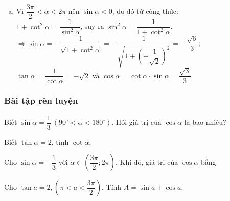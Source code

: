 \begin{vd}
{\begin{enumerate}[a)]
			\item 
			Vì $\dfrac{3\pi}{2}<\alpha<2\pi$ nên $\sin\alpha<0$, do đó từ công thức:\\
			$1+\cot^2\alpha=\dfrac{1}{\sin^2\alpha}$, suy ra $\sin^2\alpha=\dfrac{1}{1+\cot^2\alpha}$.\\
			$\Rightarrow\sin\alpha=-\dfrac{1}{\sqrt{1+\cot^2\alpha}}=-\dfrac{1}{\sqrt{1+\left(-\dfrac{1}{\sqrt{2}}\right)^2}}=-\dfrac{\sqrt{6}}{3}$;\\ $\tan\alpha=\dfrac{1}{\cot\alpha}=-\sqrt{2}$ và $\cos\alpha=\cot\alpha\cdot\sin\alpha=\dfrac{\sqrt{3}}{3}$.
		\end{enumerate}
	}
\end{vd}
\subsubsection{Bài tập rèn luyện}
\centerline{}
\begin{bt}%
	Biết $\sin{\alpha}=\dfrac{1}{3}\ \left(90^{\circ}<\alpha<180^{\circ}\right)$. Hỏi giá trị của $\cos{\alpha}$ là bao nhiêu?
\end{bt}
\begin{bt}%
	Biết $\tan{\alpha}=2$, tính $\cot{\alpha}$.
\end{bt}
\begin{bt}%
	Cho $\sin \alpha=-\dfrac{1}{3}$ với $\alpha \in\left(\dfrac{3 \pi}{2};2 \pi\right)$. Khi đó, giá trị của $\cos \alpha$ bằng
\end{bt}
\begin{bt}%
	Cho $\tan a=2,\left(\pi<a<\dfrac{3\pi}{2}\right).$ Tính $A=\sin a+\cos a.$
\end{bt}
